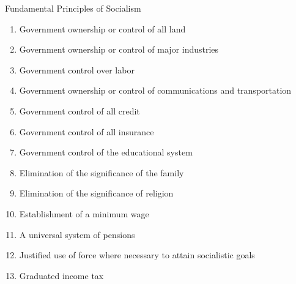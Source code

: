 \begin{frame}{Fundamental Principles of Socialism}
    \begin{enumerate}
        \item Government ownership or control of all land
        \item Government ownership or control of major industries
        \item Government control over labor
        \item Government ownership or control of communications and transportation
        \item Government control of all credit
        \item Government control of all insurance
        \item Government control of the educational system
        \item Elimination of the significance of the family
        \item Elimination of the significance of religion
        \item Establishment of a minimum wage
        \item A universal system of pensions
        \item Justified use of force where necessary to attain socialistic goals
        \item Graduated income tax
    \end{enumerate}
\end{frame}

%

